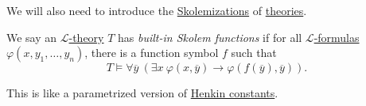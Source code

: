 We will also need to introduce the \hyperref[not:Skolemization]{Skolemizations} of \hyperref[def:theory]{theories}.

\begin{definition}\label{def:built-in-Skolem-function}
	We say an \hyperref[def:theory]{\(\mathcal{L} \)-theory} \(T\) has \emph{built-in Skolem functions} if for all \hyperref[def:formula]{\(\mathcal{L} \)-formulas} \(\varphi (x, y_1, \ldots , y_n)\), there is a function symbol \(f\) such that
	\[
		T\models \forall \overline{y} \ (\exists x\ \varphi (x, \overline{y} ) \to \varphi (f(\overline{y} ), \overline{y} )).
	\]
\end{definition}

\begin{intuition}
	This is like a parametrized version of \hyperref[def:Henkin-constant]{Henkin constants}.
\end{intuition}

